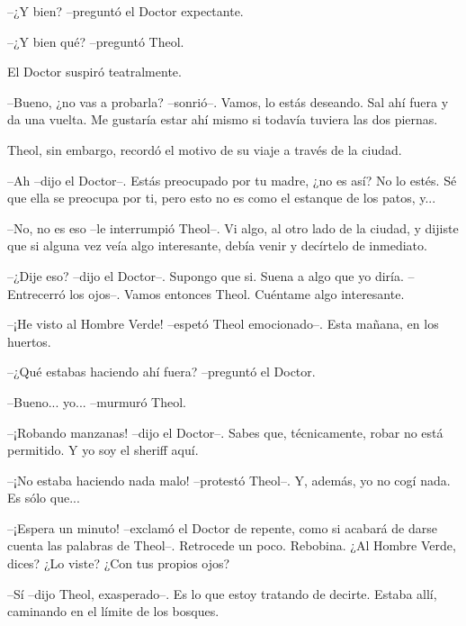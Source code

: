 --¿Y bien? --preguntó el Doctor expectante. 



--¿Y bien qué? --preguntó Theol. 



El Doctor suspiró teatralmente.

--Bueno, ¿no vas a probarla? --sonrió--. Vamos, lo estás deseando. Sal ahí fuera y da una vuelta. Me gustaría estar ahí mismo si todavía tuviera las dos piernas. 



Theol, sin embargo, recordó el motivo de su viaje a través de la ciudad. 



--Ah --dijo el Doctor--. Estás preocupado por tu madre, ¿no es así? No lo estés. Sé que ella se preocupa por ti, pero esto no es como el estanque de los patos, y... 



--No, no es eso --le interrumpió Theol--. Vi algo, al otro lado de la ciudad, y dijiste que si alguna vez veía algo interesante, debía venir y decírtelo de inmediato. 



--¿Dije eso? --dijo el Doctor--. Supongo que si. Suena a algo que yo diría. --Entrecerró los ojos--. Vamos entonces Theol. Cuéntame algo interesante. 



--¡He visto al Hombre Verde! --espetó Theol emocionado--. Esta mañana, en los huertos. 



--¿Qué estabas haciendo ahí fuera? --preguntó el Doctor. 



--Bueno... yo... --murmuró Theol. 



--¡Robando manzanas! --dijo el Doctor--. Sabes que, técnicamente, robar no está permitido. Y yo soy el sheriff aquí. 



--¡No estaba haciendo nada malo! --protestó Theol--. Y, además, yo no cogí nada. Es sólo que...



--¡Espera un minuto! --exclamó el Doctor de repente, como si acabará de darse cuenta las palabras de Theol--. Retrocede un poco. Rebobina. ¿Al Hombre Verde, dices? ¿Lo viste? ¿Con tus propios ojos?



--Sí --dijo Theol, exasperado--. Es lo que estoy tratando de decirte. Estaba allí, caminando en el límite de los bosques. 



